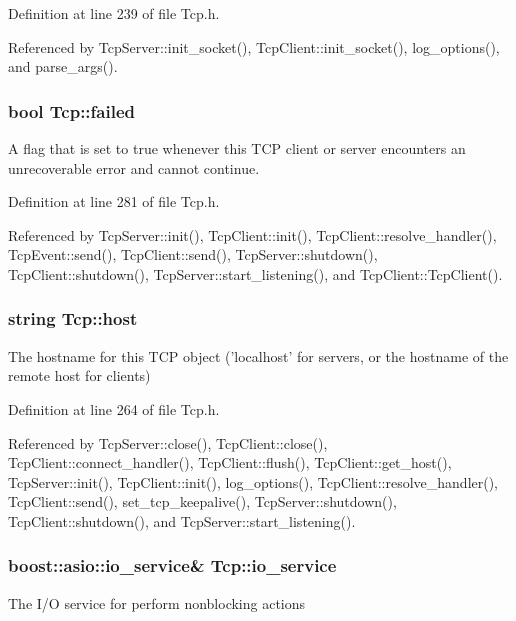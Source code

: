 Definition at line 239 of file Tcp.h.



Referenced by TcpServer::init\_\-socket(), TcpClient::init\_\-socket(), log\_\-options(), and parse\_\-args().

\hypertarget{classTcp_a9dbc59f5343aa045be1a888356ef6fbf}{
\subsubsection[{failed}]{\setlength{\rightskip}{0pt plus 5cm}bool {\bf Tcp::failed}}}
\label{classTcp_a9dbc59f5343aa045be1a888356ef6fbf}
A flag that is set to true whenever this TCP client or server encounters an unrecoverable error and cannot continue. 

Definition at line 281 of file Tcp.h.



Referenced by TcpServer::init(), TcpClient::init(), TcpClient::resolve\_\-handler(), TcpEvent::send(), TcpClient::send(), TcpServer::shutdown(), TcpClient::shutdown(), TcpServer::start\_\-listening(), and TcpClient::TcpClient().

\hypertarget{classTcp_a0e981d15f94a460b91845bce9b930c61}{
\subsubsection[{host}]{\setlength{\rightskip}{0pt plus 5cm}string {\bf Tcp::host}}}
\label{classTcp_a0e981d15f94a460b91845bce9b930c61}
The hostname for this TCP object ('localhost' for servers, or the hostname of the remote host for clients) 

Definition at line 264 of file Tcp.h.



Referenced by TcpServer::close(), TcpClient::close(), TcpClient::connect\_\-handler(), TcpClient::flush(), TcpClient::get\_\-host(), TcpServer::init(), TcpClient::init(), log\_\-options(), TcpClient::resolve\_\-handler(), TcpClient::send(), set\_\-tcp\_\-keepalive(), TcpServer::shutdown(), TcpClient::shutdown(), and TcpServer::start\_\-listening().

\hypertarget{classTcp_ad0c319a0974aa3f07e9c5ae290ea18b4}{
\subsubsection[{io\_\-service}]{\setlength{\rightskip}{0pt plus 5cm}boost::asio::io\_\-service\& {\bf Tcp::io\_\-service}}}
\label{classTcp_ad0c319a0974aa3f07e9c5ae290ea18b4}
The I/O service for perform nonblocking actions 

